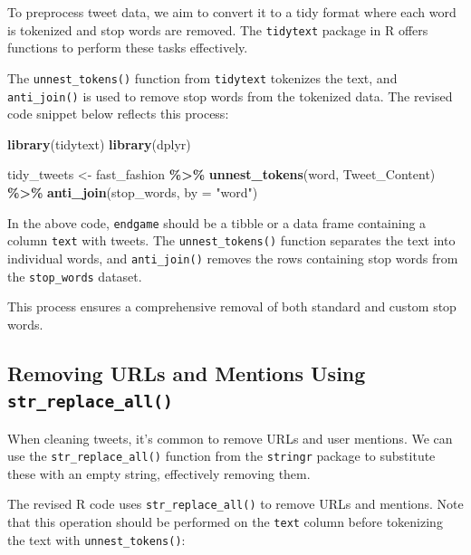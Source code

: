 \documentclass[
]{book}
\newenvironment{Shaded}{\begin{snugshade}}{\end{snugshade}}
\newcommand{\AttributeTok}[1]{\textcolor[rgb]{0.13,0.29,0.53}{#1}}
\newcommand{\FunctionTok}[1]{\textcolor[rgb]{0.13,0.29,0.53}{\textbf{#1}}}
\newcommand{\NormalTok}[1]{#1}
\newcommand{\OtherTok}[1]{\textcolor[rgb]{0.56,0.35,0.01}{#1}}
\newcommand{\SpecialCharTok}[1]{\textcolor[rgb]{0.81,0.36,0.00}{\textbf{#1}}}
\newcommand{\StringTok}[1]{\textcolor[rgb]{0.31,0.60,0.02}{#1}}
\begin{document}
To preprocess tweet data, we aim to convert it to a tidy format where each word is tokenized and stop words are removed. The \texttt{tidytext} package in R offers functions to perform these tasks effectively.

The \texttt{unnest\_tokens()} function from \texttt{tidytext} tokenizes the text, and \texttt{anti\_join()} is used to remove stop words from the tokenized data. The revised code snippet below reflects this process:

\begin{Shaded}
\begin{Highlighting}[]
\FunctionTok{library}\NormalTok{(tidytext)}
\FunctionTok{library}\NormalTok{(dplyr)}

\NormalTok{tidy\_tweets }\OtherTok{\textless{}{-}}\NormalTok{ fast\_fashion }\SpecialCharTok{\%\textgreater{}\%}
  \FunctionTok{unnest\_tokens}\NormalTok{(word, Tweet\_Content) }\SpecialCharTok{\%\textgreater{}\%}
  \FunctionTok{anti\_join}\NormalTok{(stop\_words, }\AttributeTok{by =} \StringTok{"word"}\NormalTok{)}
\end{Highlighting}
\end{Shaded}

In the above code, \texttt{endgame} should be a tibble or a data frame containing a column \texttt{text} with tweets. The \texttt{unnest\_tokens()} function separates the text into individual words, and \texttt{anti\_join()} removes the rows containing stop words from the \texttt{stop\_words} dataset.

This process ensures a comprehensive removal of both standard and custom stop words.

\hypertarget{removing-urls-and-mentions-using-str_replace_all}{%
\subsection{\texorpdfstring{Removing URLs and Mentions Using \texttt{str\_replace\_all()}}{Removing URLs and Mentions Using str\_replace\_all()}}\label{removing-urls-and-mentions-using-str_replace_all}}

When cleaning tweets, it's common to remove URLs and user mentions. We can use the \texttt{str\_replace\_all()} function from the \texttt{stringr} package to substitute these with an empty string, effectively removing them.

The revised R code uses \texttt{str\_replace\_all()} to remove URLs and mentions. Note that this operation should be performed on the \texttt{text} column before tokenizing the text with \texttt{unnest\_tokens()}:
\end{document}
